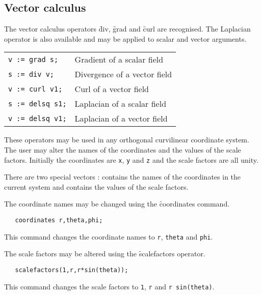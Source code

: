 \subsection{ Vector calculus}

 
 
 
 
\hypertarget{operator:DIV}{}
\hypertarget{operator:GRAD}{}
\hypertarget{operator:CURL}{}
\hypertarget{operator:DELSQ}{}
The vector calculus operators \f{div}, \f{grad} and \f{curl} are recognised.
The Laplacian operator is also available and may be applied to
scalar and vector arguments.

\begin{tabular}{l l}
\texttt{v := grad s;} & Gradient of a scalar field \\
\texttt{s := div v;} & Divergence of a vector field \\
\texttt{v := curl v1;} & Curl of a vector field \\
\texttt{s := delsq s1;} & Laplacian of a scalar field \\
\texttt{v := delsq v1;} & Laplacian of a vector field \\
\end{tabular}

These operators may be used in any orthogonal curvilinear coordinate
system. The user may alter the names of the coordinates and the values
of the scale factors. Initially the coordinates are \texttt{x}, \texttt{y}
and \texttt{z} and the scale factors are all unity.

 
\hypertarget{reserved:COORDS}{}
\hypertarget{reserved:HFACTORS}{}
There are two special vectors :  contains the names
of the coordinates in the current system and 
contains the values of the scale factors.

\hypertarget{operator:COORDINATES}{}
The coordinate names may be changed using the \f{coordinates}
command.
\begin{verbatim}
   coordinates r,theta,phi;
\end{verbatim}
This command changes the coordinate names to \texttt{r}, \texttt{theta} and
\texttt{phi}.

\hypertarget{operator:SCALEFACTORS}{}
The scale factors may be altered using the \f{scalefactors} operator.
\begin{verbatim}
   scalefactors(1,r,r*sin(theta));
\end{verbatim}
This command changes the scale factors to \texttt{1}, \texttt{r} and \texttt{r sin(theta)}.

